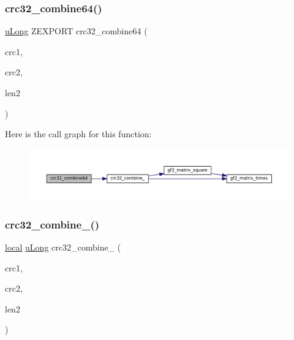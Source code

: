 \subsubsection{\texorpdfstring{crc32\+\_\+combine64()}{crc32\_combine64()}}
{\footnotesize\ttfamily \mbox{\hyperlink{ioapi_8h_a50e9e9d5c30e481de822ad68fe537986}{u\+Long}} Z\+E\+X\+P\+O\+RT crc32\+\_\+combine64 (\begin{DoxyParamCaption}\item[{\mbox{\hyperlink{ioapi_8h_a50e9e9d5c30e481de822ad68fe537986}{u\+Long}}}]{crc1,  }\item[{\mbox{\hyperlink{ioapi_8h_a50e9e9d5c30e481de822ad68fe537986}{u\+Long}}}]{crc2,  }\item[{z\+\_\+off64\+\_\+t}]{len2 }\end{DoxyParamCaption})}

Here is the call graph for this function\+:
\nopagebreak
\begin{figure}[H]
\begin{center}
\leavevmode
\includegraphics[width=350pt]{third-party_2zlib_2crc32_8c_ac14c100da9646dc4b3d1422ffe736829_cgraph}
\end{center}
\end{figure}
\mbox{\label{third-party_2zlib_2crc32_8c_a36a8eb95bf402949b5a68f7157df7ca2}} 
\subsubsection{\texorpdfstring{crc32\+\_\+combine\+\_\+()}{crc32\_combine\_()}}
{\footnotesize\ttfamily \mbox{\hyperlink{zutil_8h_a08023ea6765c99d60a6a3840cd07156e}{local}} \mbox{\hyperlink{ioapi_8h_a50e9e9d5c30e481de822ad68fe537986}{u\+Long}} crc32\+\_\+combine\+\_\+ (\begin{DoxyParamCaption}\item[{\mbox{\hyperlink{ioapi_8h_a50e9e9d5c30e481de822ad68fe537986}{u\+Long}}}]{crc1,  }\item[{\mbox{\hyperlink{ioapi_8h_a50e9e9d5c30e481de822ad68fe537986}{u\+Long}}}]{crc2,  }\item[{z\+\_\+off64\+\_\+t}]{len2 }\end{DoxyParamCaption})}

